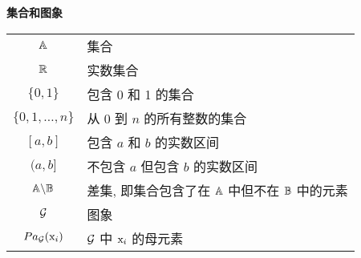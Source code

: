 \vspace{\notationgap}
\begin{minipage}{\textwidth}
\centerline{\bf 集合和图象}
\bgroup
\def\arraystretch{1.5}
\begin{tabular}{cp{3.25in}}
$\displaystyle {\mathbb{A}}$ & 集合\\
$\displaystyle \mathbb{R}$ & 实数集合 \\
$\displaystyle \{0, 1\}$ & 包含 0 和 1 的集合 \\
$\displaystyle \{0, 1, \dots, n \}$ & 从 $0$ 到 $n$ 的所有整数的集合 \\
$\displaystyle [a, b]$ & 包含 $a$ 和 $b$ 的实数区间\\
$\displaystyle (a, b]$ & 不包含 $a$ 但包含 $b$ 的实数区间\\
$\displaystyle {\mathbb{A}} \backslash {\mathbb{B}}$ & 差集, 即集合包含了在 ${\mathbb{A}}$ 中但不在 ${\mathbb{B}}$ 中的元素\\
$\displaystyle {\mathcal{G}}$ & 图象\\
$\displaystyle Pa_{\mathcal{G}}({\textnormal{x}}_i)$ & ${\mathcal{G}}$ 中 ${\textnormal{x}}_i$ 的母元素
\end{tabular}
\egroup
{}
\end{minipage}

